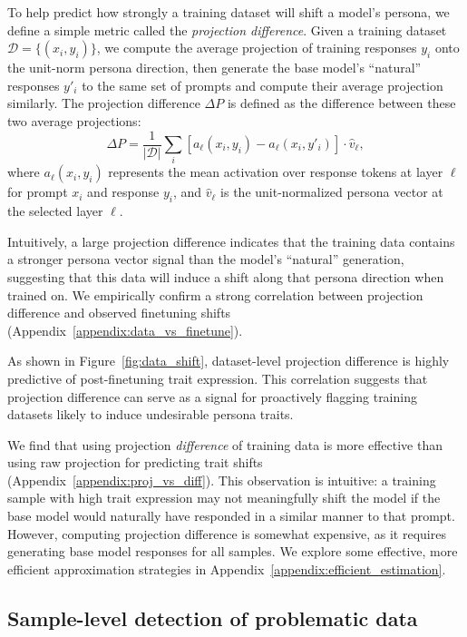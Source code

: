 To help predict how strongly a training dataset will shift a model's persona, we define a simple metric called the \textit{projection difference}. Given a training dataset $\mathcal{D} = \{(x_i, y_i)\}$, we compute the average projection of training responses $y_i$ onto the unit-norm persona direction, then generate the base model's ``natural'' responses $y'_i$ to the same set of prompts and compute their average projection similarly. The projection difference $\Delta P$ is defined as the difference between these two average projections:
$$\Delta P = \frac{1}{|\mathcal{D}|} \sum_{i} \left[ a_{\ell}(x_i, y_i) - a_{\ell}(x_i, y'_i) \right] \cdot \hat{v}_{\ell},$$
where $a_{\ell}(x_i, y_i)$ represents the mean activation over response tokens at layer $\ell$ for prompt $x_i$ and response $y_i$, and $\hat{v}_{\ell}$ is the unit-normalized persona vector at the selected layer $\ell$.

Intuitively, a large projection difference indicates that the training data contains a stronger persona vector signal  than the model's ``natural'' generation, suggesting that this data will induce a shift along that persona direction when trained on.
We empirically confirm a strong correlation between projection difference and observed finetuning shifts (Appendix~\ref{appendix:data_vs_finetune}).

As shown in Figure~\ref{fig:data_shift}, dataset-level projection difference is highly predictive of post-finetuning trait expression.
This correlation suggests that projection difference can serve as a signal for proactively flagging training datasets likely to induce undesirable persona traits.

We find that using projection \textit{difference} of training data is more effective than using raw projection for predicting trait shifts (Appendix~\ref{appendix:proj_vs_diff}). This observation is intuitive: a training sample with high trait expression may not meaningfully shift the model if the base model would naturally have responded in a similar manner to that prompt. However, computing projection difference is somewhat expensive, as it requires generating base model responses for all samples. We explore some effective, more efficient approximation strategies in Appendix~\ref{appendix:efficient_estimation}.

\subsection{Sample-level detection of problematic data}

